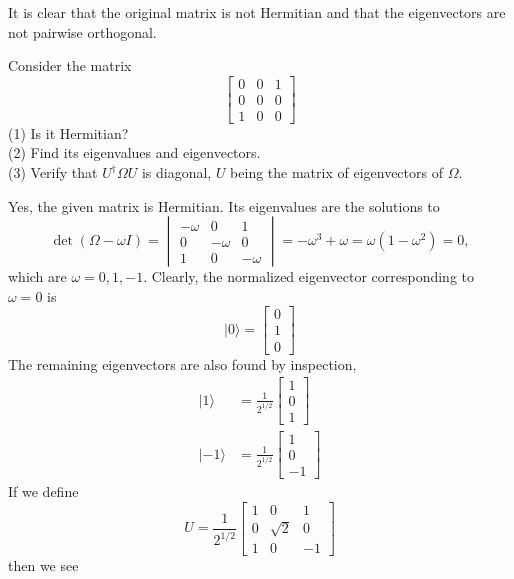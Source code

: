 \documentclass[../principles-of-quantum-mechanics.tex]{subfiles}
\begin{document}
\begin{questions}
\begin{solution}
		It is clear that the original matrix is not Hermitian and that the eigenvectors are not pairwise orthogonal.
\end{solution}

\question Consider the matrix
\[
	\begin{bmatrix}0 & 0 & 1 \\ 0 & 0 & 0 \\ 1 & 0 & 0\end{bmatrix}
\]
(1) Is it Hermitian? \\
(2) Find its eigenvalues and eigenvectors. \\
(3) Verify that $U^\dagger\Omega{U}$ is diagonal, $U$ being the matrix of eigenvectors of $\Omega$.

\begin{solution}
	Yes, the given matrix is Hermitian. Its eigenvalues are the solutions to
	\[
		\det(\Omega - \omega{I}) = \begin{vmatrix}
			-\omega & 0 & 1 \\ 0 & -\omega & 0 \\ 1 & 0 & -\omega
		\end{vmatrix} = -\omega^3+\omega = \omega(1 - \omega^2) = 0,
	\]
	which are $\omega=0,1,{-1}$. Clearly, the normalized eigenvector corresponding to $\omega=0$ is
	\[
		|0\rangle = \begin{bmatrix}0 \\ 1 \\ 0\end{bmatrix}
	\]
	The remaining eigenvectors are also found by inspection,
	\begin{align*}
		|1\rangle &= \frac{1}{2^{1/2}}\begin{bmatrix}1 \\ 0 \\ 1\end{bmatrix} \\
		|{-1}\rangle &= \frac{1}{2^{1/2}}\begin{bmatrix}1 \\ 0 \\ -1\end{bmatrix}
	\end{align*}
	If we define
	\[
		U = \frac{1}{2^{1/2}}\begin{bmatrix}1 & 0 & 1 \\ 0 & \sqrt{2} & 0 \\ 1 & 0 & {-1}\end{bmatrix}
	\]
	then we see
	\begin{align*}

\end{align*}
\end{solution}
\end{questions}
\end{document}
